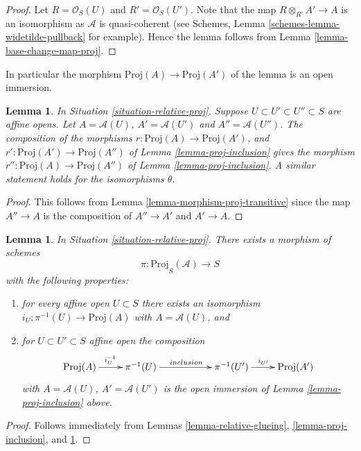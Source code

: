 \documentclass{stacks-project}
\theoremstyle{plain}
\newtheorem{lemma}[subsection]{Lemma}
\theoremstyle{definition}
\theoremstyle{remark}
\numberwithin{equation}{subsection}
\begin{document}
\begin{proof}
Let $R = \mathcal{O}_S(U)$ and $R' = \mathcal{O}_S(U')$.
Note that the map $R \otimes_{R'} A' \to A$ is an isomorphism as
$\mathcal{A}$ is quasi-coherent
(see Schemes, Lemma \ref{schemes-lemma-widetilde-pullback} for example).
Hence the lemma follows from
Lemma \ref{lemma-base-change-map-proj}.
\end{proof}

\noindent
In particular the morphism $\text{Proj}(A) \to \text{Proj}(A')$
of the lemma is an open immersion.

\begin{lemma}
\label{lemma-transitive-proj}
In Situation \ref{situation-relative-proj}.
Suppose $U \subset U' \subset U'' \subset S$ are affine opens.
Let $A = \mathcal{A}(U)$, $A' = \mathcal{A}(U')$ and $A'' = \mathcal{A}(U'')$.
The composition of the morphisms
$r : \text{Proj}(A) \to \text{Proj}(A')$, and
$r' : \text{Proj}(A') \to \text{Proj}(A'')$ of
Lemma \ref{lemma-proj-inclusion} gives the
morphism $r'' : \text{Proj}(A) \to \text{Proj}(A'')$
of Lemma \ref{lemma-proj-inclusion}. A similar statement
holds for the isomorphisms $\theta$.
\end{lemma}

\begin{proof}
This follows from Lemma \ref{lemma-morphism-proj-transitive} since
the map $A'' \to A$ is the composition of $A'' \to A'$ and
$A' \to A$.
\end{proof}

\begin{lemma}
\label{lemma-glue-relative-proj}
In Situation \ref{situation-relative-proj}.
There exists a morphism of schemes
$$
\pi : \underline{\text{Proj}}_S(\mathcal{A}) \longrightarrow S
$$
with the following properties:
\begin{enumerate}
\item for every affine open $U \subset S$ there exists an isomorphism
$i_U : \pi^{-1}(U) \to \text{Proj}(A)$ with $A = \mathcal{A}(U)$, and
\item for $U \subset U' \subset S$ affine open the composition
$$
\xymatrix{
\text{Proj}(A) \ar[r]^{i_U^{-1}} &
\pi^{-1}(U) \ar[rr]^{inclusion} & &
\pi^{-1}(U') \ar[r]^{i_{U'}} &
\text{Proj}(A')
}
$$
with $A = \mathcal{A}(U)$, $A' = \mathcal{A}(U')$
is the open immersion of Lemma \ref{lemma-proj-inclusion} above.
\end{enumerate}
\end{lemma}

\begin{proof}
Follows immediately from
Lemmas \ref{lemma-relative-glueing},
\ref{lemma-proj-inclusion}, and
\ref{lemma-transitive-proj}.
\end{proof}
\end{document}
